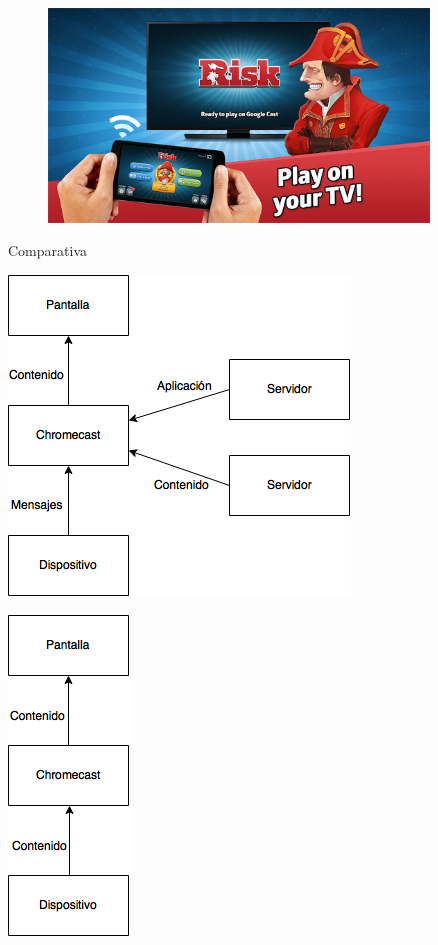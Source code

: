 \begin{frame}
	\begin{figure}[H]
		\centering
		\includegraphics[width=0.9\textwidth]{./Imagenes/risk.png}
	\end{figure}
\end{frame}

\begin{frame}{Comparativa}
	\begin{minipage}[b]{.45\textwidth}
		\centering
		\includegraphics[scale=0.52]{./Imagenes/ChromecastModo1.png}
	\end{minipage}\qquad
	\hspace{1.65cm}
	\begin{minipage}[b]{.3\textwidth}
		\centering
		\includegraphics[scale=0.52]{./Imagenes/ChromecastModo2.png}
	\end{minipage}
\end{frame}
